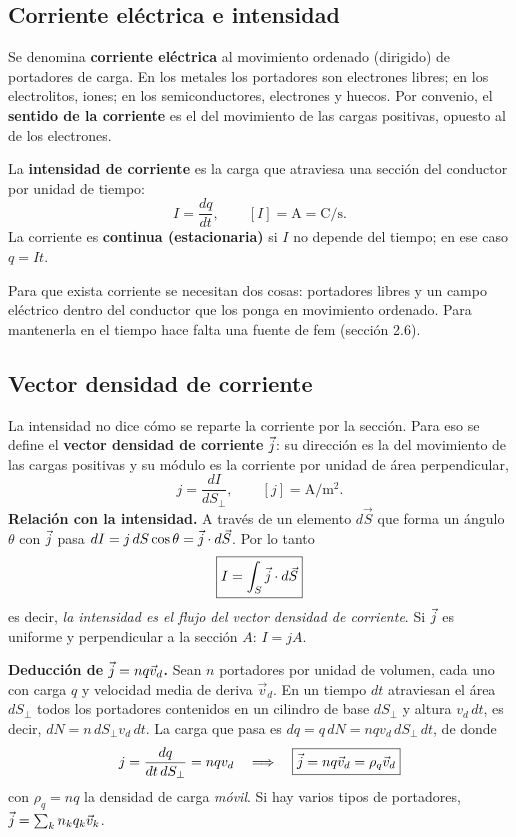 \documentclass[11pt]{article}
\begin{document}
\subsection{Corriente eléctrica e intensidad}
Se denomina \textbf{corriente eléctrica} al movimiento ordenado (dirigido) de portadores de carga. En los metales los portadores son electrones libres; en los electrolitos, iones; en los semiconductores, electrones y huecos. Por convenio, el \textbf{sentido de la corriente} es el del movimiento de las cargas positivas, opuesto al de los electrones.

La \textbf{intensidad de corriente} es la carga que atraviesa una sección del conductor por unidad de tiempo:
\[
I=\frac{dq}{dt},\qquad [I]=\mathrm{A}=\mathrm{C/s}.
\]
La corriente es \textbf{continua (estacionaria)} si $I$ no depende del tiempo; en ese caso $q=It$.

Para que exista corriente se necesitan dos cosas: portadores libres y un campo eléctrico dentro del conductor que los ponga en movimiento ordenado. Para mantenerla en el tiempo hace falta una fuente de fem (sección 2.6).

\subsection{Vector densidad de corriente}
La intensidad no dice cómo se reparte la corriente por la sección. Para eso se define el \textbf{vector densidad de corriente} $\vec{j}$: su dirección es la del movimiento de las cargas positivas y su módulo es la corriente por unidad de área perpendicular,
\[
j=\frac{dI}{dS_\perp},\qquad [j]=\mathrm{A/m^2}.
\]
\textbf{Relación con la intensidad.} A través de un elemento $d\vec S$ que forma un ángulo $\theta$ con $\vec{j}$ pasa $dI=j\,dS\cos\theta=\vec{j}\cdot d\vec S$. Por lo tanto
\[
\boxed{I=\int_S \vec{j}\cdot d\vec S}
\]
es decir, \emph{la intensidad es el flujo del vector densidad de corriente}. Si $\vec{j}$ es uniforme y perpendicular a la sección $A$: $I=jA$.

\textbf{Deducción de $\vec{j}=nq\vec v_d$.} Sean $n$ portadores por unidad de volumen, cada uno con carga $q$ y velocidad media de deriva $\vec v_d$. En un tiempo $dt$ atraviesan el área $dS_\perp$ todos los portadores contenidos en un cilindro de base $dS_\perp$ y altura $v_d\,dt$, es decir, $dN=n\,dS_\perp v_d\,dt$. La carga que pasa es $dq=q\,dN=nqv_d\,dS_\perp\,dt$, de donde
\[
j=\frac{dq}{dt\,dS_\perp}=nqv_d\quad\Longrightarrow\quad\boxed{\vec{j}=nq\vec v_d=\rho_q\vec v_d}
\]
con $\rho_q=nq$ la densidad de carga \emph{móvil}. Si hay varios tipos de portadores, $\vec{j}=\sum_k n_kq_k\vec v_k$.
\end{document}
